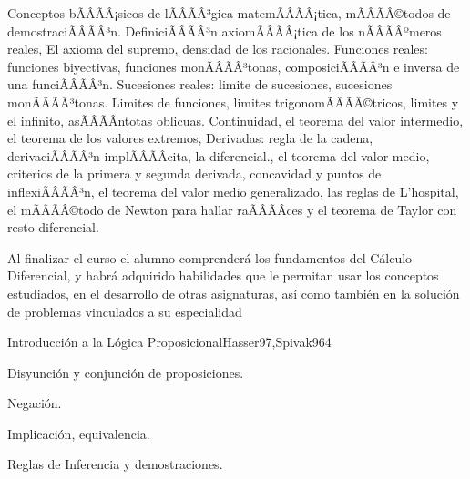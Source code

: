 \begin{sumilla}


\begin{fundamentacion}
Conceptos bÃÂÃÂ¡sicos de lÃÂÃÂ³gica matemÃÂÃÂ¡tica, mÃÂÃÂ©todos de demostraciÃÂÃÂ³n. DefiniciÃÂÃÂ³n axiomÃÂÃÂ¡tica de los nÃÂÃÂºmeros reales, El axioma del supremo, densidad de los racionales. Funciones reales: funciones biyectivas, funciones monÃÂÃÂ³tonas, composiciÃÂÃÂ³n e inversa de una funciÃÂÃÂ³n. Sucesiones reales: limite de sucesiones, sucesiones monÃÂÃÂ³tonas.  Limites de funciones, limites trigonomÃÂÃÂ©tricos, limites y el infinito, asÃÂÃÂ­ntotas  oblicuas. Continuidad, el teorema del valor intermedio, el teorema de los valores extremos, Derivadas: regla de la cadena, derivaciÃÂÃÂ³n implÃÂÃÂ­cita, la diferencial., el teorema del valor medio, criterios de la primera y segunda derivada, concavidad y puntos de inflexiÃÂÃÂ³n, el teorema del valor medio generalizado, las reglas de L'hospital, el mÃÂÃÂ©todo de Newton para hallar raÃÂÃÂ­ces y el  teorema de Taylor  con resto diferencial.
\end{fundamentacion}

\begin{objetivosdelcurso}
\item Al finalizar el curso el alumno comprender\'a los fundamentos del C\'alculo Diferencial, y habr\'a adquirido habilidades que le permitan usar los conceptos estudiados, en el desarrollo de otras asignaturas, as\'i como tambi\'en en la soluci\'on de problemas vinculados a su especialidad 
\end{objetivosdelcurso}

\begin{outcomes}
\end{outcomes}

\begin{unit}{Introducci\'on a la L\'ogica Proposicional}{Hasser97,Spivak96}{4}
\begin{topicos}
      \item Disyunci\'on y conjunci\'on de proposiciones.
      \item Negaci\'on.
      \item Implicaci\'on, equivalencia.
      \item Reglas de Inferencia y demostraciones.
   \end{topicos}


\end{unit}
\end{sumilla}
